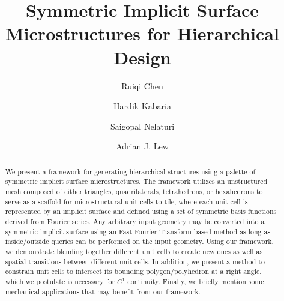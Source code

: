 \documentclass[acmtog]{acmart}
\begin{document}
\title{Symmetric Implicit Surface Microstructures for Hierarchical Design}

\author{Ruiqi Chen}
\author{Hardik Kabaria}
\author{Saigopal Nelaturi}

\author{Adrian J. Lew}

\renewcommand{\shortauthors}{Chen et al.}

\begin{abstract}
  We present a framework for generating hierarchical structures using a palette of symmetric implicit surface microstructures. The framework utilizes an unstructured mesh composed of either triangles, quadrilaterals, tetrahedrons, or hexahedrons to serve as a scaffold for microstructural unit cells to tile, where each unit cell is represented by an implicit surface and defined using a set of symmetric basis functions derived from Fourier series. Any arbitrary input geometry may be converted into a symmetric implicit surface using an Fast-Fourier-Transform-based method as long as inside/outside queries can be performed on the input geometry. Using our framework, we demonstrate blending together different unit cells to create new ones as well as spatial transitions between different unit cells. In addition, we present a method to constrain unit cells to intersect its bounding polygon/polyhedron at a right angle, which we postulate is necessary for $C^1$ continuity. Finally, we briefly mention some mechanical applications that may benefit from our framework.
\end{abstract}
\end{document}
